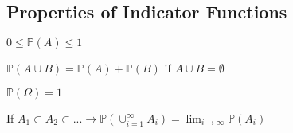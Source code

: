 \subsection{Properties of Indicator Functions}
\begin{ppty}
    $0 \leq \mathbb{P}(A) \leq 1$
\end{ppty}
\begin{ppty}
    $\mathbb{P}(A\cup B) = \mathbb{P}(A) + \mathbb{P}(B)$ if $A \cup B = \emptyset$
\end{ppty}
\begin{ppty}
    $\mathbb{P}(\Omega) = 1$
\end{ppty}
\begin{ppty}
    If $A_1 \subset A_2 \subset ... \rightarrow \mathbb{P}(\cup_{i=1}^{\infty}A_i) = \lim_{i\rightarrow\infty}\mathbb{P}(A_i)$ 
\end{ppty}
